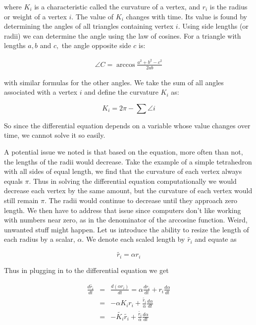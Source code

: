 \documentclass[12pt]{article}
\begin{document}
\noindent where $K_i$ is a characteristic called the curvature of a vertex, and $r_i$ is the radius or weight of a vertex $i$. The value of $K_i$ changes with time. Its value is found by determining the angles of all triangles containing vertex $i$. Using side lengths (or radii) we can determine the angle using the law of cosines. For a triangle with lengths $a, b$ and $c,$ the angle opposite side $c$ is:
  
  \begin{eqnarray*}
  \angle C = \arccos\frac{a^2 + b^2 - c^2}{2ab}
  \end{eqnarray*} 
  
\noindent with similar formulas for the other angles. We take the sum of all angles associated with a vertex $i$ and define the curvature $K_i$ as:

  \begin{equation}
  K_i = 2\pi - \sum{\angle i}
  \end{equation}
  
\noindent So since the differential equation depends on a variable whose value changes over time, we cannot solve it so easily.\newline
   
\noindent A potential issue we noted is that based on the equation, more often than not, the lengths of the radii would decrease. Take the example of a simple tetrahedron with all sides of equal length, we find that the curvature of each vertex always equals $\pi$. Thus in solving the differential equation computationally we would decrease each vertex by the same amount, but the curvature of each vertex would still remain $\pi$. The radii would continue to decrease until they approach zero length. We then have to address that issue since computers don't like working with numbers near zero, as in the denominator of the arccosine function. Weird, unwanted stuff might happen. Let us introduce the ability to resize the length of each radius by a scalar, $\alpha$. We denote each scaled length by $\tilde{r_i}$ and equate as
 
 \begin{equation}
 \tilde{r_i} = \alpha r_i
 \end{equation} 
 
\noindent Thus in plugging in to the differential equation we get
 
 \begin{eqnarray}
 \label{ref1}
 \frac{d\tilde{r_i}}{dt} &=& \frac{d(\alpha r_i)}{dt} = \alpha \frac{dr_i}{dt} + r_i\frac{d\alpha}{dt}\nonumber\\
 &=& -\alpha K_ir_i + \frac{\tilde{r_i}}{\alpha}\frac{d\alpha}{dt} \nonumber \\
 &=& -\tilde{K_i}\tilde{r_i} + \frac{\tilde{r_i}}{\alpha}\frac{d\alpha}{dt}
 \end{eqnarray}
 
\end{document}
